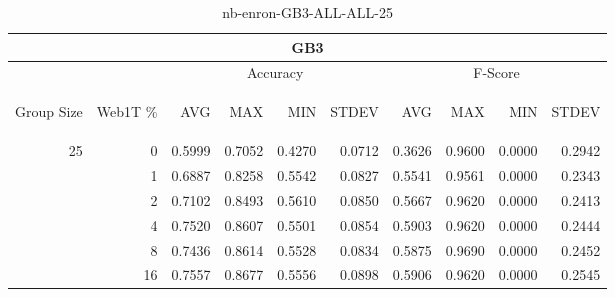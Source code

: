 \begin{center}
\begin{table}[htbp]
\begin{tabular}{ | r | r | r | r | r | r | r | r | r | r |}
\hline
\multicolumn{10}{|c|}{GB3}\\
\hline
 & & \multicolumn{4}{|c|}{Accuracy} & \multicolumn{4}{|c|}{F-Score}\\ \cline{3-10}
\begin{sideways}Group Size\end{sideways} & \begin{sideways}Web1T \%\end{sideways} & \begin{sideways}AVG\end{sideways} & \begin{sideways}MAX\end{sideways} & \begin{sideways}MIN\end{sideways} & \begin{sideways}STDEV\end{sideways} & \begin{sideways}AVG\end{sideways} & \begin{sideways}MAX\end{sideways} & \begin{sideways}MIN\end{sideways} & \begin{sideways}STDEV\end{sideways}\\
\hline
\multirow{6}{*}{25}
 & 0 & 0.5999 & 0.7052 & 0.4270 & 0.0712 & 0.3626 & 0.9600 & 0.0000 & 0.2942\\ \cline{2-10}
 & 1 & 0.6887 & 0.8258 & 0.5542 & 0.0827 & 0.5541 & 0.9561 & 0.0000 & 0.2343\\ \cline{2-10}
 & 2 & 0.7102 & 0.8493 & 0.5610 & 0.0850 & 0.5667 & 0.9620 & 0.0000 & 0.2413\\ \cline{2-10}
 & 4 & 0.7520 & 0.8607 & 0.5501 & 0.0854 & 0.5903 & 0.9620 & 0.0000 & 0.2444\\ \cline{2-10}
 & 8 & 0.7436 & 0.8614 & 0.5528 & 0.0834 & 0.5875 & 0.9690 & 0.0000 & 0.2452\\ \cline{2-10}
 & 16 & 0.7557 & 0.8677 & 0.5556 & 0.0898 & 0.5906 & 0.9620 & 0.0000 & 0.2545\\ \cline{2-10}
\hline
\end{tabular}
\caption{nb-enron-GB3-ALL-ALL-25}
\end{table}
\end{center}

